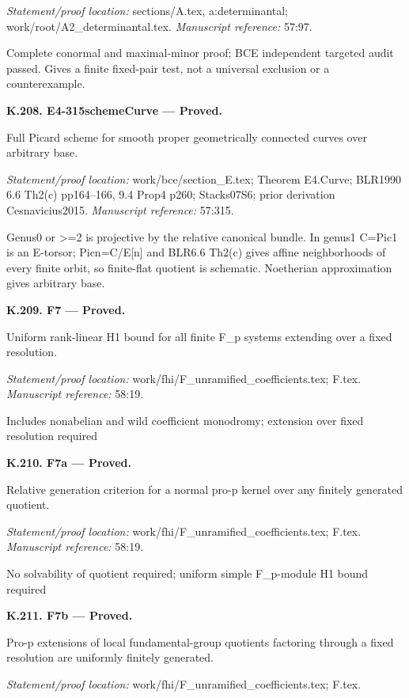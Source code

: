 \par\emph{Statement/proof location:} sections/A.tex, a:determinantal; work/root/A2\_determinantal.tex.
\emph{Manuscript reference:} 57:97.
\par Complete conormal and maximal-minor proof; BCE independent targeted audit passed. Gives a finite fixed-pair test, not a universal exclusion or a counterexample.
\par\medskip\noindent\textbf{K.208. E4-315schemeCurve --- Proved.}\par
Full Picard scheme for smooth proper geometrically connected curves over arbitrary base.
\par\emph{Statement/proof location:} work/bce/section\_E.tex; Theorem E4.Curve; BLR1990 6.6 Th2(c) pp164–166, 9.4 Prop4 p260; Stacks07S6; prior derivation Cesnavicius2015.
\emph{Manuscript reference:} 57:315.
\par Genus0 or >=2 is projective by the relative canonical bundle. In genus1 C=Pic1 is an E-torsor; Picn=C/E[n] and BLR6.6 Th2(c) gives affine neighborhoods of every finite orbit, so finite-flat quotient is schematic. Noetherian approximation gives arbitrary base.
\par\medskip\noindent\textbf{K.209. F7 --- Proved.}\par
Uniform rank-linear H1 bound for all finite F\_p systems extending over a fixed resolution.
\par\emph{Statement/proof location:} work/fhi/F\_unramified\_coefficients.tex; F.tex.
\emph{Manuscript reference:} 58:19.
\par Includes nonabelian and wild coefficient monodromy; extension over fixed resolution required
\par\medskip\noindent\textbf{K.210. F7a --- Proved.}\par
Relative generation criterion for a normal pro-p kernel over any finitely generated quotient.
\par\emph{Statement/proof location:} work/fhi/F\_unramified\_coefficients.tex; F.tex.
\emph{Manuscript reference:} 58:19.
\par No solvability of quotient required; uniform simple F\_p-module H1 bound required
\par\medskip\noindent\textbf{K.211. F7b --- Proved.}\par
Pro-p extensions of local fundamental-group quotients factoring through a fixed resolution are uniformly finitely generated.
\par\emph{Statement/proof location:} work/fhi/F\_unramified\_coefficients.tex; F.tex.
